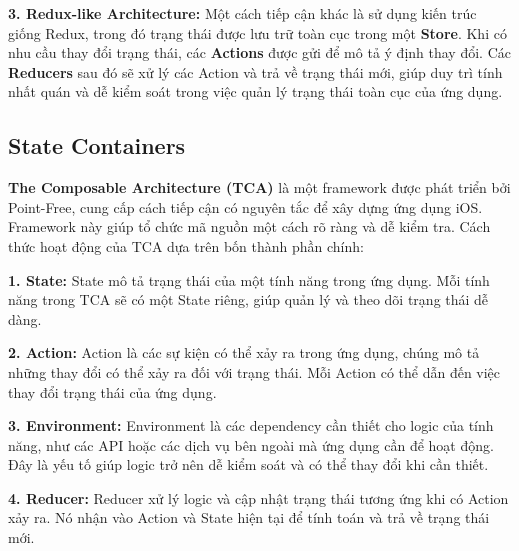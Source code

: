 \textbf{3. Redux-like Architecture:} Một cách tiếp cận khác là sử dụng kiến trúc giống Redux, trong đó trạng thái được lưu trữ toàn cục trong một \textbf{Store}. Khi có nhu cầu thay đổi trạng thái, các \textbf{Actions} được gửi để mô tả ý định thay đổi. Các \textbf{Reducers} sau đó sẽ xử lý các Action và trả về trạng thái mới, giúp duy trì tính nhất quán và dễ kiểm soát trong việc quản lý trạng thái toàn cục của ứng dụng.


\subsection{State Containers}

\textbf{The Composable Architecture (TCA)} là một framework được phát triển bởi Point-Free, cung cấp cách tiếp cận có nguyên tắc để xây dựng ứng dụng iOS. Framework này giúp tổ chức mã nguồn một cách rõ ràng và dễ kiểm tra. Cách thức hoạt động của TCA dựa trên bốn thành phần chính:

\vspace{0.5em}

\textbf{1. State:} State mô tả trạng thái của một tính năng trong ứng dụng. Mỗi tính năng trong TCA sẽ có một State riêng, giúp quản lý và theo dõi trạng thái dễ dàng.

\vspace{0.5em}

\textbf{2. Action:} Action là các sự kiện có thể xảy ra trong ứng dụng, chúng mô tả những thay đổi có thể xảy ra đối với trạng thái. Mỗi Action có thể dẫn đến việc thay đổi trạng thái của ứng dụng.

\vspace{0.5em}

\textbf{3. Environment:} Environment là các dependency cần thiết cho logic của tính năng, như các API hoặc các dịch vụ bên ngoài mà ứng dụng cần để hoạt động. Đây là yếu tố giúp logic trở nên dễ kiểm soát và có thể thay đổi khi cần thiết.

\vspace{0.5em}

\textbf{4. Reducer:} Reducer xử lý logic và cập nhật trạng thái tương ứng khi có Action xảy ra. Nó nhận vào Action và State hiện tại để tính toán và trả về trạng thái mới.

